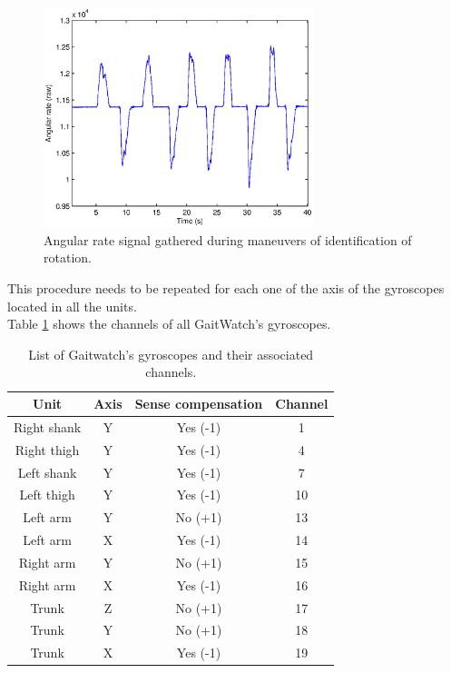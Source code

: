 \begin{figure}[H]
\centering
\includegraphics[width=0.7\textwidth]{figures/gyro_axis_ID_signal.eps}
\caption{Angular rate signal gathered during maneuvers of identification of rotation.}
\label{fig:rotation_axis_sense2}
\end{figure}

This procedure needs to be repeated for each one of the axis of the gyroscopes located in all the units. \\
\indent Table \ref{tab:gyro_channels} shows the channels of all GaitWatch's gyroscopes.

\begin{table}[H]
\caption{List of Gaitwatch's gyroscopes and their associated channels.}
	\centering
		\begin{tabular}{|c|c|c|c|}\hline
		\label{tab:gyro_channels}
		Unit 				& Axis 	& Sense compensation 	& Channel 	\\ \hline
		Right shank & Y			& Yes (-1)						& 1					\\
		Right thigh & Y			& Yes (-1)						& 4					\\
		Left shank  & Y			& Yes (-1)						& 7					\\
		Left thigh  & Y			& Yes (-1)						& 10				\\
		Left arm		& Y			& No  (+1)						& 13				\\
		Left arm		& X			& Yes (-1)						& 14				\\
		Right arm		& Y			& No  (+1)						& 15				\\
		Right arm		& X			& Yes (-1)						& 16				\\
		Trunk				& Z			& No	(+1)						& 17				\\
		Trunk				& Y			& No	(+1)						& 18				\\	
		Trunk				& X			& Yes	(-1)						& 19				\\ \hline
		\end{tabular}
\end{table}

